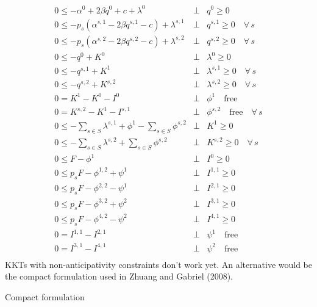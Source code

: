 \documentclass[11pt,a4paper]{article}
\begin{document}
\begin{eqnarray*}
	0 \leq -\alpha^0 + 2\beta q^0 + c + \lambda^0 &\bot& q^0 \geq 0\\
        0 \leq -p_s\left(\alpha^{s,1} - 2\beta q^{s,1} - c\right) + \lambda^{s,1} &\bot& q^{s,1} \geq 0\quad\forall\,s\\
       0 \leq -p_s\left(\alpha^{s,2} - 2\beta q^{s,2} - c\right) + \lambda^{s,2} &\bot& q^{s,2} \geq 0\quad\forall\,s\\
	0 \leq -q^0 + K^0 &\bot& \lambda^0 \geq 0 \\
        0 \leq -q^{s,1} + K^{1} &\bot& \lambda^{s,1} \geq 0 \quad\forall\,s\\
        0 \leq -q^{s,2} + K^{s,2} &\bot& \lambda^{s,2} \geq 0 \quad\forall\,s\\
        0 = K^1 - K^0 - I^0 &\bot& \phi^1 \quad \mbox{free} \\
        0 = K^{s,2} - K^1 - I^{s,1} &\bot& \phi^{s,2} \quad \mbox{free}\quad\forall\,s \\
        0 \leq -\sum_{s\in S}\lambda^{s,1} + \phi^{1}-\sum_{s\in S}\phi^{s,2} &\bot& K^1 \geq 0 \\
        0 \leq -\sum_{s\in S}\lambda^{s,2} + \sum_{s\in S}\phi^{s,2} &\bot& K^{s,2} \geq 0\quad\forall\,s \\
        0 \leq F - \phi^{1} &\bot& I^0 \geq 0\\
        0 \leq p_sF - \phi^{1,2} + \psi^1 &\bot& I^{1,1} \geq 0 \\
        0 \leq p_sF - \phi^{2,2} - \psi^1 &\bot& I^{2,1} \geq 0 \\
        0 \leq p_sF - \phi^{3,2} + \psi^2 &\bot& I^{3,1} \geq 0 \\
        0 \leq p_sF - \phi^{4,2} - \psi^2&\bot& I^{4,1} \geq 0 \\
        0 = I^{1,1}-I^{2,1}&\bot& \psi^1\quad \mbox{free} \\
        0 = I^{3,1}-I^{4,1}&\bot& \psi^2\quad \mbox{free} \\
\end{eqnarray*}
KKTs with non-anticipativity constraints don't work yet. An alternative would be the compact formulation used in Zhuang and Gabriel (2008).

Compact formulation
\end{document}
